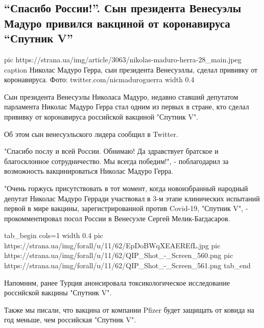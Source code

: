 
 
 
 
 
 
\subsection{\enquote{Спасибо России!}. Сын президента Венесуэлы Мадуро привился вакциной от коронавируса \enquote{Спутник V}}
\label{sec:12_12_2020.news.ua.strana.1.spasibo_rossii_sputnik_v_venezuela}

\ifcmt
  pic https://strana.ua/img/article/3063/nikolas-maduro-herra-28_main.jpeg
  caption Николас Мадуро Герра, сын президента Венесуэллы, сделал прививку от коронавируса. Фото: twitter.com/nicmaduroguerra 
  width 0.4
\fi

Сын президента Венесуэлы Николаса Мадуро, недавно ставший депутатом парламента
Николас Мадуро Герра стал одним из первых в стране, кто сделал прививку от
коронавируса российской вакциной "Спутник V".

Об этом сын венесуэльского лидера сообщил в Twitter.

"Спасибо послу и всей России. Обнимаю! Да здравствует братское и благосклонное
сотрудничество. Мы всегда победим!", - поблагодарил за возможность
вакцинироваться Николас Мадуро Герра.

"Очень горжусь присутствовать в тот момент, когда новоизбранный народный
депутат Николас Мадуро Герради участвовал в 3-м этапе клинических испытаний
первой в мире вакцины, зарегистрированной против Covid-19, "Спутник V", -
прокомментировал посол России в Венесуэле Сергей Мелик-Багдасаров.


\ifcmt
tab_begin cols=1
  width 0.4
  pic https://strana.ua/img/forall/u/11/62/EpDoBWqXEAEREfL.jpg
  pic https://strana.ua/img/forall/u/11/62/QIP_Shot_-_Screen_560.png
  pic https://strana.ua/img/forall/u/11/62/QIP_Shot_-_Screen_561.png
tab_end
\fi

Напомним, ранее Турция анонсировала токсикологическое исследование российской
вакцины "Спутник
V".

Также мы писали, что вакцина от компании Pfizer будет защищать от ковида на год
меньше,
чем российская "Спутник V".

